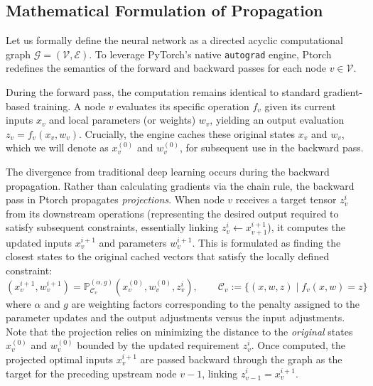 \subsection{Mathematical Formulation of Propagation}
Let us formally define the neural network as a directed acyclic computational graph $\mathcal{G} = (\mathcal{V}, \mathcal{E})$. To leverage PyTorch's native \texttt{autograd} engine, Ptorch redefines the semantics of the forward and backward passes for each node $v \in \mathcal{V}$. 

During the forward pass, the computation remains identical to standard gradient-based training. A node $v$ evaluates its specific operation $f_v$ given its current inputs $x_v$ and local parameters (or weights) $w_v$, yielding an output evaluation $z_v = f_v(x_v, w_v)$. Crucially, the engine caches these original states $x_v$ and $w_v$, which we will denote as $x_v^{(0)}$ and $w_v^{(0)}$, for subsequent use in the backward pass.

The divergence from traditional deep learning occurs during the backward propagation. Rather than calculating gradients via the chain rule, the backward pass in Ptorch propagates \textit{projections}. When node $v$ receives a target tensor $z_v^i$ from its downstream operations (representing the desired output required to satisfy subsequent constraints, essentially linking $z_v^i \leftarrow x_{v+1}^{i+1}$), it computes the updated inputs $x_v^{i+1}$ and parameters $w_v^{i+1}$. This is formulated as finding the closest states to the original cached vectors that satisfy the locally defined constraint:
\begin{equation}
    (x_v^{i+1}, w_v^{i+1}) = \mathbb{P}_{\mathcal{C}_v}^{(\alpha, g)}\left(x_v^{(0)}, w_v^{(0)}, z_v^{i}\right),
    \qquad \mathcal{C}_v := \{(x,w,z) \mid f_v(x,w)=z\}
\end{equation}
where $\alpha$ and $g$ are weighting factors corresponding to the penalty assigned to the parameter updates and the output adjustments versus the input adjustments. Note that the projection relies on minimizing the distance to the \emph{original} states $x_v^{(0)}$ and $w_v^{(0)}$ bounded by the updated requirement $z_v^i$. Once computed, the projected optimal inputs $x_v^{i+1}$ are passed backward through the graph as the target for the preceding upstream node $v-1$, linking $z_{v-1}^i = x_v^{i+1}$.

